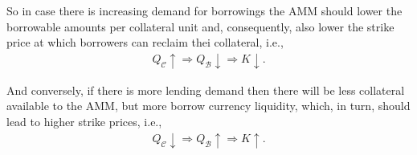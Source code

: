 \documentclass[a4paper]{article}
\begin{document}
So in case there is increasing demand for borrowings the AMM should lower the borrowable amounts per collateral unit and, consequently, also lower the strike price at which borrowers can reclaim thei collateral, i.e.,
\begin{equation}
\label{eq:more_borrowing_strike}
\begin{split}
Q_{\mathcal{C}}\uparrow \Rightarrow Q_{\mathcal{B}}\downarrow \Rightarrow K\downarrow.
\end{split}
\end{equation}

And conversely, if there is more lending demand then there will be less collateral available to the AMM, but more borrow currency liquidity, which, in turn, should lead to higher strike prices, i.e.,
\begin{equation}
\label{eq:more_lending_strike}
\begin{split}
Q_{\mathcal{C}}\downarrow \Rightarrow Q_{\mathcal{B}}\uparrow \Rightarrow K\uparrow.
\end{split}
\end{equation}
\end{document}
